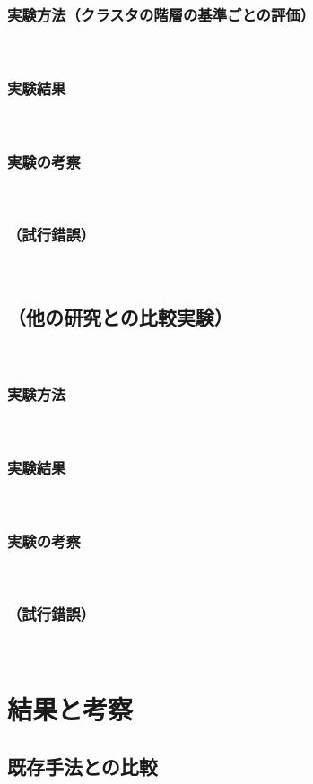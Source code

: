 \documentclass[12pt,a4j]{jreport}
\begin{document}
\subsection{実験方法（クラスタの階層の基準ごとの評価）}
~

\subsection{実験結果}
~

\subsection{実験の考察}
~

\subsection{（試行錯誤）}
~

\section{（他の研究との比較実験）}
~

\subsection{実験方法}
~

\subsection{実験結果}
~

\subsection{実験の考察}
~

\subsection{（試行錯誤）}
~


\chapter{結果と考察}


\section{既存手法との比較}
~
\end{document}
